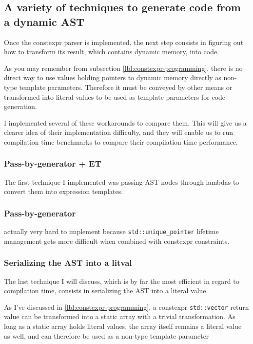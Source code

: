 \documentclass[../main]{subfiles}
\begin{document}
\subsection{
  A variety of techniques to generate code from a dynamic AST
}

Once the \gls{constexpr} parser is implemented, the next step consists in
figuring out how to transform its result, which contains dynamic memory,
into \cpp code.

As you may remember from subsection \ref{lbl:constexpr-programming},
there is no direct way to use values holding pointers to dynamic memory
directly as non-type template parameters.
Therefore it must be conveyed by other means or transformed into literal values
to be used as template parameters for \cpp code generation.

I implemented several of these workarounds to compare them.
This will give us a clearer idea of their implementation difficulty,
and they will enable us to run compilation time benchmarks to compare their
compilation time performance.

\subsubsection{Pass-by-generator + ET}

The first technique I implemented was passing AST nodes through lambdas
to convert them into expression templates.

\subsubsection{Pass-by-generator}

actually very hard to implement because \lstinline{std::unique_pointer}
lifetime management gets more difficult when combined with
\gls{constexpr} constraints.


\subsubsection{Serializing the AST into a \gls{litval}}

The last technique I will discuss, which is by far the most efficient
in regard to compilation time, consists in serializing the AST into a
literal value.

As I've discussed in \ref{lbl:constexpr-programming}, a \gls{constexpr}
\lstinline{std::vector} return value can be transformed into a static array with
a trivial transformation. As long as a static array holds literal values,
the array itself remains a literal value as well, and can therefore be used
as a non-type template parameter
\end{document}
